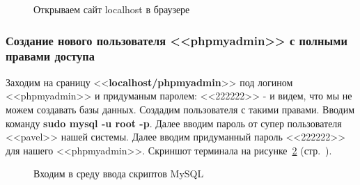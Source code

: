\begin{figure}[p]
    \caption{Открываем сайт localhost в браузере}
    \label{fig:sudo-apt-install-apache2-step-7}
\end{figure}

\newpage


\subsubsection{Создание нового пользователя <<phpmyadmin>> с полными правами доступа}

Заходим на сраницу <<\textbf{localhost/phpmyadmin}>> под логином <<phpmyadmin>> и придуманым паролем: <<222222>> - и видем, что мы не можем создавать базы данных. Создадим пользователя с такими правами. Вводим команду \textbf{sudo mysql -u root -p}. Далее вводим пароль от супер пользователя <<pavel>> нашей системы. Далее вводим придуманный пароль <<222222>> для нашего <<phpmyadmin>>.
Скриншот терминала на рисунке~\ref{fig:make-phpmyadmin-superuser-step-0} (стр.~\pageref{fig:make-phpmyadmin-superuser-step-0}).

\begin{figure}[p]
    \caption{Входим в среду ввода скриптов MySQL}
    \label{fig:make-phpmyadmin-superuser-step-0}
\end{figure}

